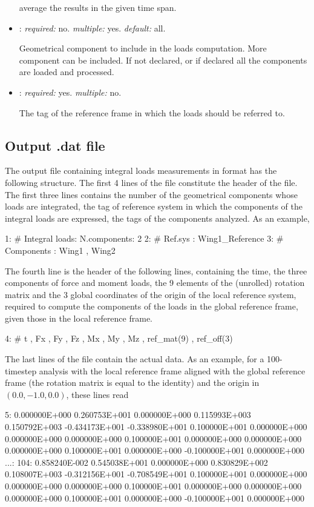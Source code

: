 \begin{itemize}
average the results in the given time span.

\item {}: \textit{required:} no. \textit{multiple:} yes. \textit{default:} all.

Geometrical component to include in the loads computation. More component can be included. 
If not declared, or if declared  all the components are loaded and processed. 

\item {}: \textit{required:} yes. \textit{multiple:} no.

The tag of the reference frame in which the loads should be referred to. 

\end{itemize}

\subsection{Output .dat file}
The output file containing integral loads measurements in  format has 
the following structure.
The first 4 lines of the file constitute the header of the file. The first three 
lines contains the number of the geometrical components  whose loads 
are integrated, the tag of reference system in which the components of the integral 
loads are expressed, the tags of the  components analyzed. As an example,
\begin{inputfile}
  1:  # Integral loads: N.components: 2
  2:  #                 Ref.sys     : Wing1_Reference
  3:  #                 Components  : Wing1 , Wing2
\end{inputfile}
The fourth line is the header of the following lines, containing the time, 
the three components of force and moment loads, the 9 elements of the (unrolled) 
rotation matrix and the 3 global coordinates of the origin of the local reference 
system, required to compute the components of the loads in the global reference 
frame, given those in the local reference frame.
\begin{inputfile}
  4:  #  t , Fx , Fy , Fz , Mx , My , Mz , ref_mat(9) , ref_off(3) 
\end{inputfile}
The last lines of the file contain the actual data. As an example, for a 
100-timestep analysis with the local reference frame  
aligned with the global reference frame (the rotation matrix is equal to the identity) 
and the origin in $(0.0,-1.0,0.0)$, these lines read
\begin{inputfile}
  5: 0.000000E+000  0.260753E+001  0.000000E+000  0.115993E+003
     0.150792E+003 -0.434173E+001 -0.338980E+001  0.100000E+001
     0.000000E+000  0.000000E+000  0.000000E+000  0.100000E+001
     0.000000E+000  0.000000E+000  0.000000E+000  0.100000E+001
     0.000000E+000 -0.100000E+001  0.000000E+000
...:
104: 0.858240E-002  0.545038E+001  0.000000E+000  0.830829E+002
     0.108007E+003 -0.312156E+001 -0.708549E+001  0.100000E+001
     0.000000E+000  0.000000E+000  0.000000E+000  0.100000E+001
     0.000000E+000  0.000000E+000  0.000000E+000  0.100000E+001
     0.000000E+000 -0.100000E+001  0.000000E+000
\end{inputfile}

